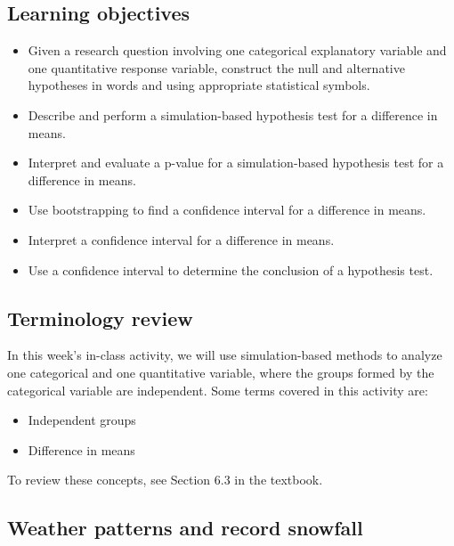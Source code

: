 \documentclass[
]{report}
\begin{document}
\hypertarget{learning-objectives-6}{%
\subsection{Learning objectives}\label{learning-objectives-6}}

\begin{itemize}
\item
  Given a research question involving one categorical explanatory variable and one quantitative response variable, construct the null and alternative hypotheses
  in words and using appropriate statistical symbols.
\item
  Describe and perform a simulation-based hypothesis test for a difference in means.
\item
  Interpret and evaluate a p-value for a simulation-based hypothesis test for a difference in means.
\item
  Use bootstrapping to find a confidence interval for a difference in means.
\item
  Interpret a confidence interval for a difference in means.
\item
  Use a confidence interval to determine the conclusion of a hypothesis test.
\end{itemize}

\hypertarget{terminology-review-10}{%
\subsection{Terminology review}\label{terminology-review-10}}

In this week's in-class activity, we will use simulation-based methods to analyze one categorical and one quantitative variable, where the groups formed by the categorical variable are independent. Some terms covered in this activity are:

\begin{itemize}
\item
  Independent groups
\item
  Difference in means
\end{itemize}

To review these concepts, see Section 6.3 in the textbook.

\hypertarget{weather-patterns-and-record-snowfall}{%
\subsection{Weather patterns and record snowfall}\label{weather-patterns-and-record-snowfall}}
\end{document}
